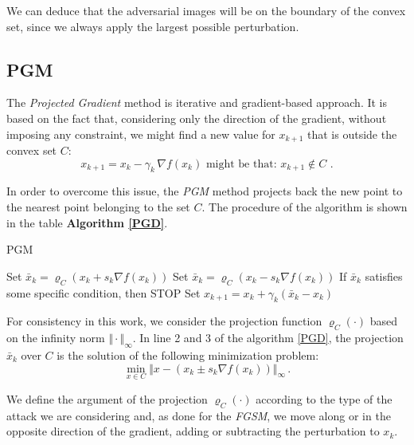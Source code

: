 \documentclass[10pt,twocolumn,letterpaper, english]{article}
\theoremstyle{definition}
\theoremstyle{plain}
\theoremstyle{plain}
\theoremstyle{plain}
\theoremstyle{plain}
\theoremstyle{remark}
\theoremstyle{remark}
\theoremstyle{definition}
\theoremstyle{definition}
\theoremstyle{definition}
\theoremstyle{definition}
\renewcommand{\rho}{\varrho}
\begin{document}
We can deduce that the adversarial images will be on the boundary of the convex set, since we always apply the largest possible perturbation. 

\subsection{PGM}

The \textit{Projected Gradient} method is iterative and gradient-based approach. 
It is based on the fact that, considering only the direction of the gradient, without imposing any constraint, we might find a new value for $x_{k+1}$ that is outside the convex set $C$: 
\begin{equation*}
    x_{k+1} = x_k - \gamma_k \, \nabla f(x_k) \text{   might be that: } x_{k+1} \notin C \,\,.
\end{equation*}

In order to overcome this issue, the \textit{PGM} method projects back the new point to the nearest point belonging to the set $C$. 
The procedure of the algorithm is shown in the table \textbf{Algorithm \ref{PGD}}. 

\begin{algorithm}
\caption{PGM}\label{PGD}
\begin{algorithmic}[1]
  \State Set $ \bar{x}_k = \rho_C(x_k + s_k \nabla f(x_k))$ 
  \State Set $ \bar{x}_k = \rho_C(x_k - s_k \nabla f(x_k))$ 
  \State If $\bar{x}_k$ satisfies some specific condition, then STOP
  \State Set $x_{k+1} = x_k + \gamma_k (\bar{x}_k - x_k)$ \Comment{with $\gamma_k \in (0, 1]$}
    
\EndFor
\end{algorithmic}
\end{algorithm}

For consistency in this work, we consider the projection function $\rho_C(\cdot)$ based on the infinity norm $\Vert \cdot \Vert_\infty$. 
In line 2 and 3 of the algorithm \ref{PGD}, the projection $\bar{x}_k$ over $C$ is the solution of the following minimization problem: 
\begin{equation*}
    \min_{x \in C} \Vert x - (x_k \pm s_k \nabla f(x_k)) \Vert_\infty \,. 
\end{equation*}

We define the argument of the projection $\rho_C(\cdot)$ according to the type of the attack we are considering and, as done for the \textit{FGSM}, we move along or in the opposite direction of the gradient, adding or subtracting the perturbation to $x_k$. \\
\end{document}
